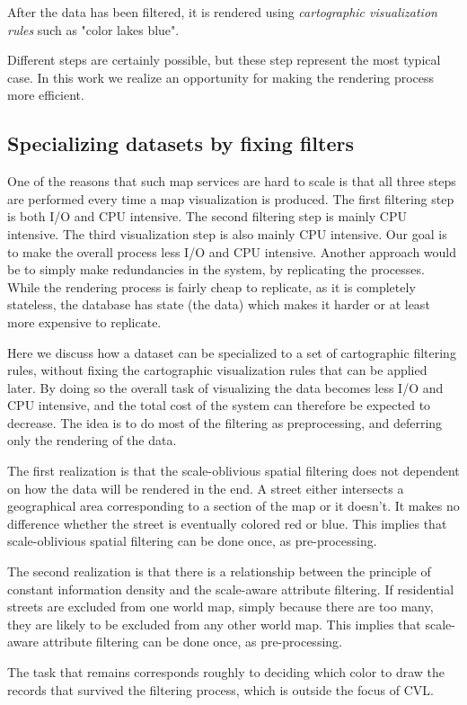  After the data has been filtered, it is rendered using \emph{cartographic visualization rules} such as "color lakes blue".

Different steps are certainly possible, but these step represent the most typical case. In this work we realize an opportunity for making the rendering process more efficient. 

\subsection{Specializing datasets by fixing filters}
One of the reasons that such map services are hard to scale is that all three steps are performed every time a map visualization is produced. The first filtering step is both I/O and CPU intensive. The second filtering step is mainly CPU intensive. The third visualization step is also mainly CPU intensive. Our goal is to make the overall process less I/O and CPU intensive. Another approach would be to simply make redundancies in the system, by replicating the processes. While the rendering process is fairly cheap to replicate, as it is completely stateless, the database has state (the data) which makes it harder or at least more expensive to replicate.

Here we discuss how a dataset can be specialized to a set of cartographic filtering rules, without fixing the cartographic visualization rules that can be applied later. By doing so the overall task of visualizing the data becomes less I/O and CPU intensive, and the total cost of the system can therefore be expected to decrease. The idea is to do most of the filtering as preprocessing, and deferring only the rendering of the data.

The first realization is that the scale-oblivious spatial filtering does not dependent on how the data will be rendered in the end. A street either intersects a geographical area corresponding to a section of the map or it doesn't. It makes no difference whether the street is eventually colored red or blue. This implies that scale-oblivious spatial filtering can be done once, as pre-processing.

The second realization is that there is a relationship between the principle of constant information density and the scale-aware attribute filtering. If residential streets are excluded from one world map, simply because there are too many, they are likely to be excluded from any other world map. This implies that scale-aware attribute filtering can be done once, as pre-processing.

The task that remains corresponds roughly to deciding which color to draw the records that survived the filtering process, which is outside the focus of CVL.


